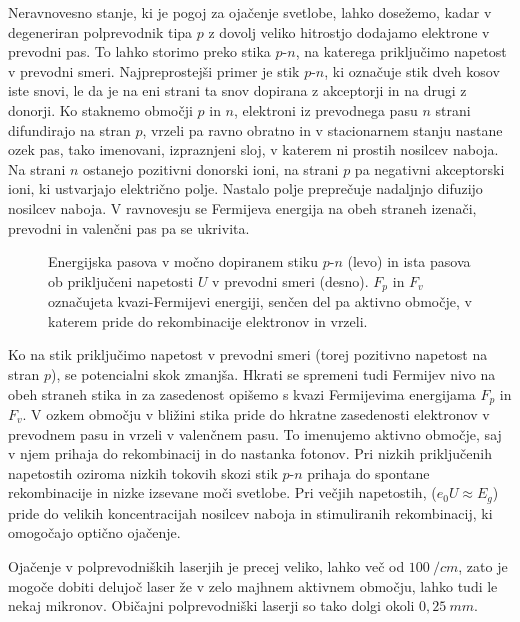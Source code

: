 Neravnovesno stanje, ki je pogoj za ojačenje svetlobe, lahko dosežemo, 
kadar v degeneriran polprevodnik tipa $p$ z dovolj veliko
hitrostjo dodajamo elektrone v prevodni pas. To lahko storimo preko stika
$p$-$n$, na katerega priključimo napetost v prevodni smeri. 
Najpreprostejši primer je stik $p$-$n$, ki označuje 
stik dveh kosov iste snovi, le da je na eni strani ta snov dopirana z 
akceptorji in na drugi z donorji. Ko staknemo območji $p$ in $n$, 
elektroni iz prevodnega pasu $n$ strani difundirajo na stran $p$, 
vrzeli pa ravno obratno in v stacionarnem stanju nastane ozek pas, 
tako imenovani, izpraznjeni sloj, v katerem ni prostih nosilcev naboja. Na strani $n$
ostanejo pozitivni donorski ioni, na strani $p$ pa negativni akceptorski 
ioni, ki ustvarjajo električno polje. Nastalo polje preprečuje nadaljnjo 
difuzijo nosilcev naboja. V ravnovesju se Fermijeva energija na obeh 
straneh izenači, prevodni in valenčni pas pa se ukrivita. 

\begin{figure}[h]
\centering
\def\svgwidth{140truemm} 

\caption{Energijska pasova v močno dopiranem stiku $p$-$n$ (levo) in 
ista pasova ob priključeni napetosti $U$ v prevodni smeri (desno). $F_p$ in $F_v$
označujeta kvazi-Fermijevi energiji, senčen del pa aktivno območje, 
v katerem pride do rekombinacije elektronov in vrzeli. 
}
\label{fig:pnlaser}
\end{figure}

Ko na stik priključimo napetost v prevodni smeri (torej pozitivno napetost na stran
$p$), se potencialni skok 
zmanjša. Hkrati se spremeni tudi Fermijev nivo na obeh straneh stika
in za zasedenost opišemo s kvazi Fermijevima energijama $F_p$ in $F_v$.
V ozkem območju v bližini stika pride do hkratne zasedenosti elektronov
v prevodnem pasu in vrzeli v valenčnem pasu. To imenujemo aktivno območje,
saj v njem prihaja do rekombinacij in do nastanka fotonov. Pri nizkih 
priključenih napetostih oziroma nizkih tokovih skozi stik $p$-$n$ prihaja
do spontane rekombinacije in nizke izsevane moči svetlobe. Pri večjih napetostih,
($e_0U \approx E_g$) pride do velikih koncentracijah nosilcev naboja in
stimuliranih rekombinacij, ki omogočajo optično ojačenje. 

Ojačenje v polprevodniških laserjih je precej veliko, lahko več od 
$100~/\si{cm}$, zato je mogoče dobiti delujoč laser že v zelo majhnem aktivnem 
območju, lahko tudi le nekaj mikronov. Običajni polprevodniški laserji so tako 
dolgi okoli $0,25~\si{mm}$.

